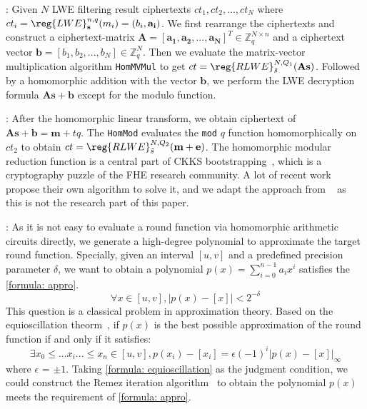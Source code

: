 :
Given $N$ LWE filtering result ciphertexts $ct_1, ct_2, ...,ct_N$
where $ct_i = \reg{LWE}_{\mathbf{s}}^{n,q}(m_i) = (b_i, \mathbf{a_i})$.
We first rearrange the ciphertexts and construct a ciphertext-matrix
$\mathbf{A} = [\mathbf{a_1}, \mathbf{a_2}, ..., \mathbf{a_N}]^{T} 
\in \mathbb{Z}_{q}^{N \times n}$ and a ciphertext vector 
$\mathbf{b} = [b_1, b_2, ...,b_N] \in \mathbb{Z}_{q}^{N}$.
Then we evaluate the matrix-vector multiplication algorithm
\texttt{HomMVMul} to get $ct = \reg{RLWE}^{N,Q_1}_{\Tilde{s}}(\mathbf{A}\mathbf{s})$.
Followed by a homomorphic addition with the vector $\mathbf{b}$, 
we perform the LWE decryption formula $\mathbf{A}\mathbf{s}+\mathbf{b}$
except for the modulo function.

:
After the homomorphic linear transform, we obtain ciphertext 
of $\mathbf{A}\mathbf{s}+\mathbf{b} = \mathbf{m} + tq$.
The \texttt{HomMod} evaluates the \texttt{mod} $q$ function homomorphically
on $ct_2$ to obtain $ct = \reg{RLWE}^{N,Q_2}_{\Tilde{s}}(\mathbf{m+e})$.
The homomorphic modular reduction function is a central part
of CKKS bootstrapping~\cite{ckksbootstrap}, 
which is a cryptography puzzle of the FHE research community.
A lot of recent work~\cite{ckksbootsparse, ckksbootvariance, sinemod}
propose their own algorithm to solve it,
and we adapt the approach from ~\cite{ckksbootsparse}
as this is not the research part of this paper.

:
As it is not easy to  evaluate a round function
via homomorphic arithmetic circuits directly, 
we generate a high-degree polynomial to 
approximate the target round function.
Specially, given an interval $[u,v]$ and a predefined 
precision parameter $\delta$, we want to obtain
a polynomial $p(x) =  {\textstyle \sum_{i=0}^{n-1}}a_ix^i $ satisfies the \cref{formula: appro}.
\begin{equation}
\forall x \in [u,v],  |p(x)-\left [x  \right ] | < 2^{-\delta } \label{formula: appro}
\end{equation}
This question is a classical problem in approximation theory.
Based on the equioscillation theorm~\cite{equioscillation}, if $p(x)$
is the best possible approximation of the round function
if and only if 
it satisfies:
\begin{equation}
\exists x_0 \leq ... x_i ... \leq x_n \in [u,v], 
p(x_i) - [x_i] = \epsilon(-1)^{i}|p(x) - [x]|_{\infty} 
\label{formula: equioscillation}
\end{equation}
where $\epsilon$ = $\pm 1$.
Taking \cref{formula: equioscillation} as the judgment condition, 
we could construct the Remez iteration algorithm~\cite{remez} to 
obtain the polynomial $p(x)$ meets the requirement of \cref{formula: appro}.

